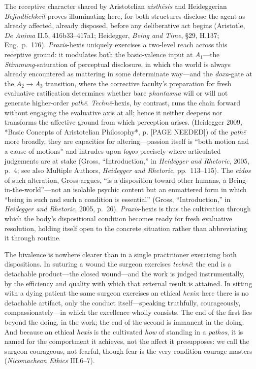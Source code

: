 \documentclass{article}
\begin{document}
The receptive character shared by Aristotelian \textit{aisth\=esis} and Heideggerian \textit{Befindlichkeit} proves illuminating here, for both structures disclose the agent as already affected, already disposed, before any deliberative act begins (Aristotle, \textit{De Anima} II.5, 416b33--417a1; Heidegger, \textit{Being and Time}, \S 29, H.137; Eng.~p.~176). \textit{Praxis}-hexis uniquely exercises a two-level reach across this receptive ground: it modulates both the basic-valence input at $A_1$---the \textit{Stimmung}-saturation of perceptual disclosure, in which the world is always already encountered as mattering in some determinate way---and the \textit{doxa}-gate at the $A_2 \rightarrow A_3$ transition, where the corrective faculty's preparation for fresh evaluative ratification determines whether bare \textit{phantasma} will or will not generate higher-order \textit{path\=e}. \textit{Techn\=e}-hexis, by contrast, runs the chain forward without engaging the evaluative axis at all; hence it neither deepens nor transforms the affective ground from which perception arises. (Heidegger 2009, *Basic Concepts of Aristotelian Philosophy*, p. [PAGE NEEDED]) of the \textit{path\=e} more broadly, they are capacities for altering---passion itself is ``both motion and a cause of motions'' and intrudes upon \textit{logos} precisely where articulated judgements are at stake (Gross, ``Introduction,'' in \textit{Heidegger and Rhetoric}, 2005, p.~4; see also Multiple Authors, \textit{Heidegger and Rhetoric}, pp.~113--115). The \textit{eidos} of such alteration, Gross argues, ``is a disposition toward other humans, a Being-in-the-world''---not an isolable psychic content but an enmattered form in which ``being in such and such a condition is essential'' (Gross, ``Introduction,'' in \textit{Heidegger and Rhetoric}, 2005, p.~26). \textit{Praxis}-hexis is thus the cultivation through which the body's dispositional condition becomes ready for fresh evaluative resolution, holding itself open to the concrete situation rather than abbreviating it through routine.

The bivalence is nowhere clearer than in a single practitioner exercising both dispositions. In suturing a wound the surgeon exercises \textit{technē}: the end is a detachable product---the closed wound---and the work is judged instrumentally, by the efficiency and quality with which that external result is attained. In sitting with a dying patient the same surgeon exercises an ethical \textit{hexis}: here there is no detachable artifact, only the conduct itself---speaking truthfully, courageously, compassionately---in which the excellence wholly consists. The end of the first lies beyond the doing, in the work; the end of the second is immanent in the doing. And because an ethical \textit{hexis} is the cultivated \textit{how} of standing in a \textit{pathos}, it is named for the comportment it achieves, not the affect it presupposes: we call the surgeon courageous, not fearful, though fear is the very condition courage masters (\textit{Nicomachean Ethics} III.6--7).
\end{document}
